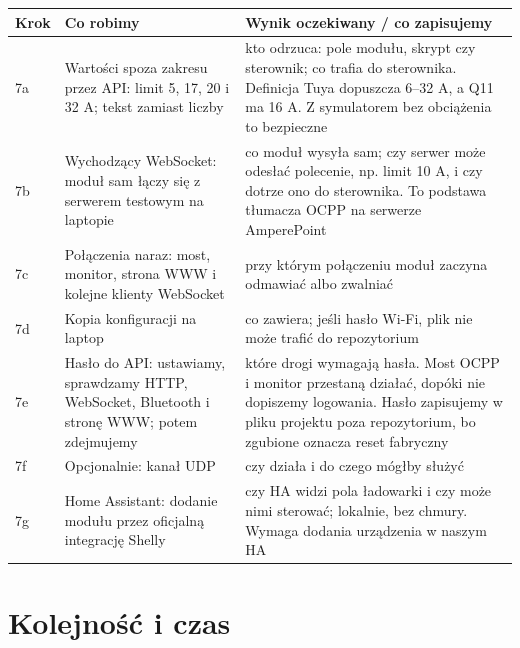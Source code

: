 \documentclass[11pt,a4paper]{article}
\begin{document}
\begin{longtable}{>{\raggedright\arraybackslash}p{3.00cm}>{\raggedright\arraybackslash}p{5.86cm}>{\raggedright\arraybackslash}p{6.42cm}}
\toprule
\rowcolor{apteallight}\textbf{Krok} & \textbf{Co robimy} & \textbf{Wynik oczekiwany / co zapisujemy} \\
\midrule\endhead
\bottomrule\endfoot
7a & Wartości spoza zakresu przez API: limit 5, 17, 20 i 32 A; tekst zamiast liczby & kto odrzuca: pole modułu, skrypt czy sterownik; co trafia do sterownika. Definicja Tuya dopuszcza 6–32 A, a Q11 ma 16 A. Z symulatorem bez obciążenia to bezpieczne \\
7b & Wychodzący WebSocket: moduł sam łączy się z serwerem testowym na laptopie & co moduł wysyła sam; czy serwer może odesłać polecenie, np. limit 10 A, i czy dotrze ono do sterownika. To podstawa tłumacza OCPP na serwerze AmperePoint \\
7c & Połączenia naraz: most, monitor, strona WWW i kolejne klienty WebSocket & przy którym połączeniu moduł zaczyna odmawiać albo zwalniać \\
7d & Kopia konfiguracji na laptop & co zawiera; jeśli hasło Wi-Fi, plik nie może trafić do repozytorium \\
7e & Hasło do API: ustawiamy, sprawdzamy HTTP, WebSocket, Bluetooth i stronę WWW; potem zdejmujemy & które drogi wymagają hasła. Most OCPP i monitor przestaną działać, dopóki nie dopiszemy logowania. Hasło zapisujemy w pliku projektu poza repozytorium, bo zgubione oznacza reset fabryczny \\
7f & Opcjonalnie: kanał UDP & czy działa i do czego mógłby służyć \\
7g & Home Assistant: dodanie modułu przez oficjalną integrację Shelly & czy HA widzi pola ładowarki i czy może nimi sterować; lokalnie, bez chmury. Wymaga dodania urządzenia w naszym HA \\
\end{longtable}

\section{Kolejność i czas}
\end{document}
